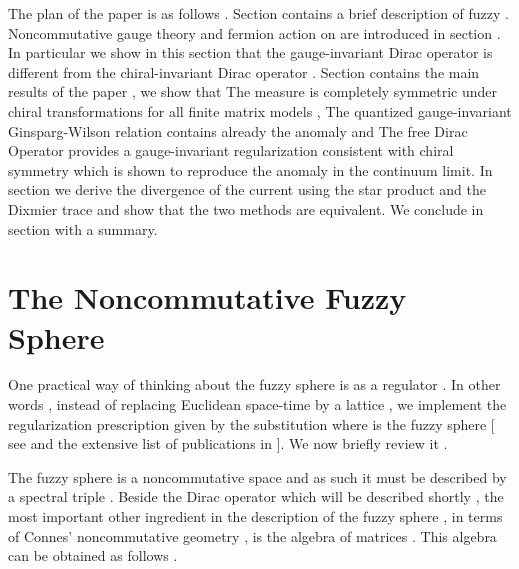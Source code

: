 \documentclass[a4paper,10pt]{article}
\begin{document}
The plan of the paper is as follows . Section \coordHE{} contains a
brief description of fuzzy \coordHE{} . Noncommutative \coordHE{}
gauge theory and fermion action on \coordHE{} are introduced
in section \coordHE{} . In particular we show in this section that the
gauge-invariant Dirac operator \coordHE{} is different from the
chiral-invariant Dirac operator \coordHE{} . Section \coordHE{} contains
the main results of the paper , we show that \coordHE{} The measure is
completely symmetric under chiral transformations for all finite
matrix models , \coordHE{} The quantized gauge-invariant Ginsparg-Wilson
relation contains already the anomaly and \coordHE{} The free Dirac
Operator \coordHE{} provides a gauge-invariant regularization
consistent with chiral symmetry which is shown to reproduce the
anomaly in the continuum limit. In section \coordHE{} we derive the
divergence of the current using the star product and the Dixmier
trace and show that the two methods are equivalent.  We conclude
in section \coordHE{} with a summary.








\section{The Noncommutative Fuzzy Sphere \coordHE{}}

One practical way of thinking about the fuzzy sphere is as a
regulator . In other words , instead of replacing Euclidean
space-time \coordHE{} by a lattice , we implement the
regularization prescription given by the substitution \coordHE{} where \coordHE{} is the
fuzzy sphere [ see \cite{madore,GKP} and the extensive list of
publications in \cite{ydri}  ]. We now briefly review it .

The fuzzy sphere is a noncommutative space and as such it must be
described by a spectral triple \coordHE{} \cite{cmlv}
. Beside the Dirac operator \coordHE{} which will be described shortly
, the most important other ingredient in the description of the
fuzzy sphere , in terms of Connes' noncommutative geometry
\cite{cmlv} , is the algebra \coordHE{} of \coordHE{}
matrices \coordHE{} . This algebra can be obtained as follows .
\end{document}
